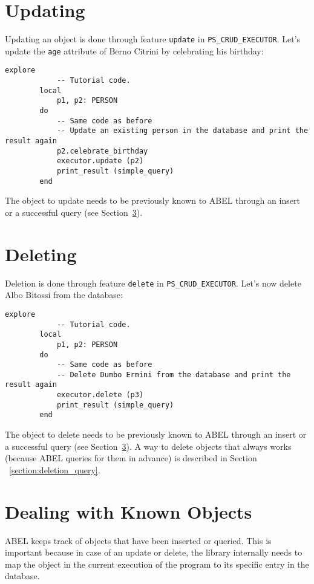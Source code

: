 \documentclass[a4paper,12pt]{report}
\begin{document}
\section{Updating}

Updating an object is done through feature \lstinline{update} in \lstinline{PS_CRUD_EXECUTOR}. Let's update the \lstinline{age} attribute of Berno Citrini by celebrating his birthday:

\begin{lstlisting}[language=OOSC2Eiffel, captionpos=b, caption={Printing the query result.}, label={lst:tutorial_print_result}]
	explore
			-- Tutorial code.
		local
			p1, p2: PERSON
		do
			-- Same code as before
			-- Update an existing person in the database and print the result again
			p2.celebrate_birthday
			executor.update (p2)
			print_result (simple_query)		
		end
\end{lstlisting}
The object to update needs to be previously known to ABEL through an insert or a successful query (see Section~\ref{section:dealing_with_known_objects}).

\section{Deleting}
\label{section:simple_delete}

Deletion is done through feature \lstinline{delete} in \lstinline{PS_CRUD_EXECUTOR}.
Let's now delete Albo Bitossi from the database:
\begin{lstlisting}[language=OOSC2Eiffel, captionpos=b, caption={Deleting an object.}, label={lst:tutorial_print_result}]
	explore
			-- Tutorial code.
		local
			p1, p2: PERSON
		do
			-- Same code as before
			-- Delete Dumbo Ermini from the database and print the result again
			executor.delete (p3)
			print_result (simple_query)
		end
\end{lstlisting}
The object to delete needs to be previously known to ABEL through an insert or a successful query (see Section~\ref{section:dealing_with_known_objects}). A way to delete objects that always works (because ABEL  queries for them in advance) is described in Section ~\ref{section:deletion_query}.
\section{Dealing with Known Objects}
\label{section:dealing_with_known_objects}

ABEL keeps track of objects that have been inserted or queried.
This is important because in case of an update or delete, the library internally needs to map the object in the current execution of the program to its specific entry in the database.
\end{document}
